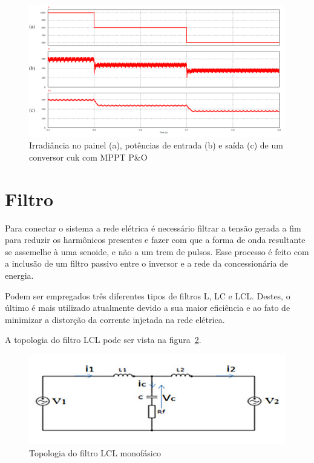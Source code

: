 \documentclass[
	12pt,				%
	openany,
	onseside,
	a4paper,			%
	english,			%
	french,				%
	spanish,			%
	brazil,				%
	]{abntex2}
\begin{document}
\begin{figure}[H]
	\captionsetup{justification=centering}
	\centering
		\includegraphics[width= \linewidth]{mppt_power_demo}
		\caption{Irradiância no painel (a), potências de entrada (b) e saída (c) de um conversor cuk com MPPT P\&O}
		\label{fig:mppt_power_demo}
\end{figure}

\section{Filtro}

Para conectar o sistema a rede elétrica é necessário filtrar a tensão gerada a fim para reduzir os harmônicos presentes e fazer com que a forma de onda resultante se assemelhe à uma senoide, e não a um trem de pulsos. Esse processo é feito com a inclusão de um filtro passivo entre o inversor e a rede da concessionária de energia.

Podem ser empregados três diferentes tipos de filtros L, LC e LCL. Destes, o último é mais utilizado atualmente devido a sua maior eficiência e ao fato de minimizar a distorção da corrente injetada na rede elétrica\cite{LCL_FILTER}\cite{LCL_FILTER_Reznik}.

A topologia do filtro LCL pode ser vista na figura~\ref{fig:lcl_filt_top}.

\begin{figure}[htbp]%
	\centering
		\includegraphics[width=0.7 \linewidth]{lcl_filt_top}
		\caption{Topologia do filtro LCL monofásico\cite{LCL_FILTER}}
		\label{fig:lcl_filt_top}
\end{figure}
\end{document}

